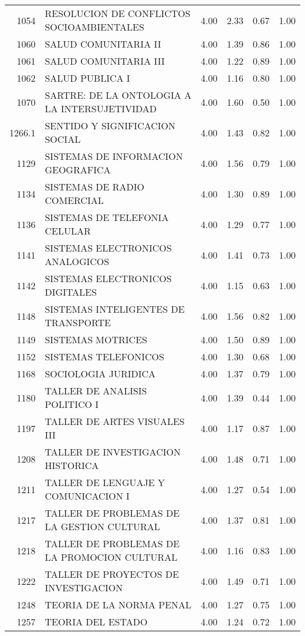 \begin{table}[ht]
\begin{tabular}{rlrrrr}
  1054 & RESOLUCION DE CONFLICTOS SOCIOAMBIENTALES & 4.00 & 2.33 & 0.67 & 1.00 \\ 
  1060 & SALUD COMUNITARIA II & 4.00 & 1.39 & 0.86 & 1.00 \\ 
  1061 & SALUD COMUNITARIA III & 4.00 & 1.22 & 0.89 & 1.00 \\ 
  1062 & SALUD PUBLICA I & 4.00 & 1.16 & 0.80 & 1.00 \\ 
  1070 & SARTRE: DE LA ONTOLOGIA A LA INTERSUJETIVIDAD & 4.00 & 1.60 & 0.50 & 1.00 \\ 
  1266.1 & SENTIDO Y SIGNIFICACION SOCIAL & 4.00 & 1.43 & 0.82 & 1.00 \\ 
  1129 & SISTEMAS DE INFORMACION GEOGRAFICA & 4.00 & 1.56 & 0.79 & 1.00 \\ 
  1134 & SISTEMAS DE RADIO COMERCIAL & 4.00 & 1.30 & 0.89 & 1.00 \\ 
  1136 & SISTEMAS DE TELEFONIA CELULAR & 4.00 & 1.29 & 0.77 & 1.00 \\ 
  1141 & SISTEMAS ELECTRONICOS ANALOGICOS & 4.00 & 1.41 & 0.73 & 1.00 \\ 
  1142 & SISTEMAS ELECTRONICOS DIGITALES & 4.00 & 1.15 & 0.63 & 1.00 \\ 
  1148 & SISTEMAS INTELIGENTES DE TRANSPORTE & 4.00 & 1.56 & 0.82 & 1.00 \\ 
  1149 & SISTEMAS MOTRICES & 4.00 & 1.50 & 0.89 & 1.00 \\ 
  1152 & SISTEMAS TELEFONICOS & 4.00 & 1.30 & 0.68 & 1.00 \\ 
  1168 & SOCIOLOGIA JURIDICA & 4.00 & 1.37 & 0.79 & 1.00 \\ 
  1180 & TALLER DE ANALISIS POLITICO I & 4.00 & 1.39 & 0.44 & 1.00 \\ 
  1197 & TALLER DE ARTES VISUALES III & 4.00 & 1.17 & 0.87 & 1.00 \\ 
  1208 & TALLER DE INVESTIGACION HISTORICA & 4.00 & 1.48 & 0.71 & 1.00 \\ 
  1211 & TALLER DE LENGUAJE Y COMUNICACION I & 4.00 & 1.27 & 0.54 & 1.00 \\ 
  1217 & TALLER DE PROBLEMAS DE LA GESTION CULTURAL & 4.00 & 1.37 & 0.81 & 1.00 \\ 
  1218 & TALLER DE PROBLEMAS DE LA PROMOCION CULTURAL & 4.00 & 1.16 & 0.83 & 1.00 \\ 
  1222 & TALLER DE PROYECTOS DE INVESTIGACION & 4.00 & 1.49 & 0.71 & 1.00 \\ 
  1248 & TEORIA DE LA NORMA PENAL & 4.00 & 1.27 & 0.75 & 1.00 \\ 
  1257 & TEORIA DEL ESTADO & 4.00 & 1.24 & 0.72 & 1.00 \\ 

\end{tabular}
\end{table}
